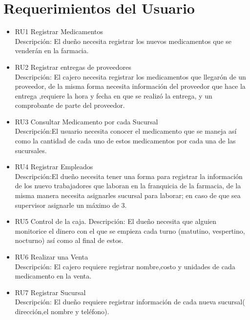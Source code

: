 \section{Requerimientos del Usuario}
\begin{itemize}

\item RU1 Registrar Medicamentos\\
Descripción: El dueño necesita registrar los nuevos medicamentos que se venderán en la farmacia.\\
\item RU2 Registrar entregas de proveedores\\
Descripción: El cajero necesita registrar los medicamentos que llegarón de un proveedor, de la misma forma necesita información del proveedor que hace la entrega ,requiere la hora y fecha en que se realizó la entrega, y un comprobante de parte del proveedor.\\

\item RU3 Consultar Medicamento por cada Sucursal\\
Descripción:El usuario necesita conocer el medicamento que se maneja así como la cantidad de cada uno de estos medicamentos por cada una de las sucursales.\\

\item RU4 Registrar Empleados\\
Descripción:El dueño necesita tener una forma para registrar la información de los nuevo trabajadores que laboran en la franquicia de la farmacia, de la misma manera necesita asignarles sucursal para laborar; en caso de que sea supervisor asignarle un máximo de 3.\\

\item RU5 Control de la caja.
Descripción: El dueño necesita que alguien monitorice el dinero con el que se empieza cada turno (matutino, vespertino, nocturno) así como al final de estos.\\

\item RU6 Realizar una Venta\\
Descripción: El cajero requiere registrar nombre,costo y unidades de cada medicamento en la venta.\\

\item RU7 Registrar Sucursal\\
Descripción: El dueño requiere registrar información de cada nueva sucursal( dirección,el nombre y teléfono).\\


\end{itemize}
